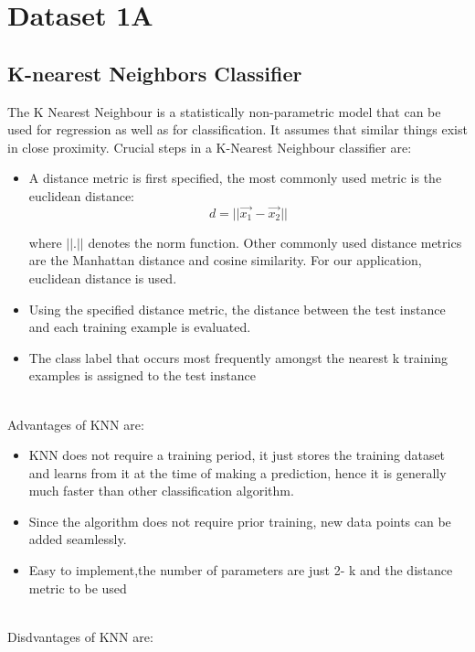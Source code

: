 \documentclass[11pt,a4paper]{article}
\newcommand{\noi}{\noindent}
\begin{document}
{\hypersetup{linkcolor=black}
 \tableofcontents}
\break


\section{Dataset 1A}
\subsection{K-nearest Neighbors Classifier}

The K Nearest Neighbour is a statistically non-parametric model that can be used for regression as well as for classification. It assumes that similar things exist in close proximity.  
\noi
Crucial steps in a K-Nearest Neighbour classifier are:
\begin{itemize}
    \item A distance metric is first specified, the most commonly used metric is the euclidean distance:
    \begin{equation}
        d=||\vec{x_{1}}-\Vec{x_{2}}||
    \end{equation}
    
    where $||.||$ denotes the norm function. Other commonly used distance metrics are the Manhattan distance and cosine similarity. For our application, euclidean distance is used. 
    \item Using the specified distance metric, the distance between the test instance and each training example is evaluated.
    \item The class label that occurs most frequently amongst the nearest k training examples is assigned to the test instance\\
\end{itemize}
\\
Advantages of KNN are:

\begin{itemize}
    \item KNN does not require a training period, it just stores the training dataset and learns from it at the time of making a prediction, hence it is generally much faster than other classification algorithm.
    \item Since the algorithm does not require prior training, new data points can be added seamlessly. 
    \item Easy to implement,the number of parameters are just 2- k and the distance metric to be used 
\end{itemize}
\\
Disdvantages of KNN are:
\end{document}
